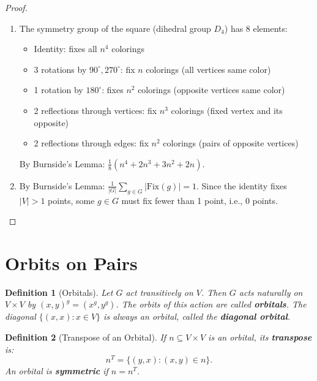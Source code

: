 \documentclass[12pt,a4paper,openany]{book}
\newtheorem{definition}{Definition}[section]
\begin{document}
\begin{proof}
\begin{enumerate}
\item The symmetry group of the square (dihedral group $D_4$) has 8 elements:
\begin{itemize}
\item Identity: fixes all $n^4$ colorings
\item 3 rotations by $90^{\circ}, 270^{\circ}$: fix $n$ colorings (all vertices same color)
\item 1 rotation by $180^\circ$: fixes $n^2$ colorings (opposite vertices same color)
\item 2 reflections through vertices: fix $n^3$ colorings (fixed vertex and its opposite)
\item 2 reflections through edges: fix $n^2$ colorings (pairs of opposite vertices)
\end{itemize}
By Burnside's Lemma: $\frac{1}{8}(n^4 + 2n^3 + 3n^2 + 2n)$.
\item By Burnside's Lemma: $\frac{1}{|G|}\sum_{g \in G} |\mathrm{Fix}(g)| = 1$. Since the identity fixes $|V| > 1$ points, some $g \in G$ must fix fewer than 1 point, i.e., 0 points.
\end{enumerate}
\end{proof}

\section{Orbits on Pairs}



\begin{definition}[Orbitals]
Let $G$ act transitively on $V$. Then $G$ acts naturally on $V \times V$ by $(x,y)^g = (x^g, y^g)$. The orbits of this action are called \textbf{orbitals}. The diagonal $\{(x,x): x \in V\}$ is always an orbital, called the \textbf{diagonal orbital}.
\end{definition}

\begin{definition}[Transpose of an Orbital]
If $n \subseteq V \times V$ is an orbital, its \textbf{transpose} is:
\[
n^T = \{(y,x) : (x,y) \in n\}.
\]
An orbital is \textbf{symmetric} if $n = n^T$.
\end{definition}
\end{document}
